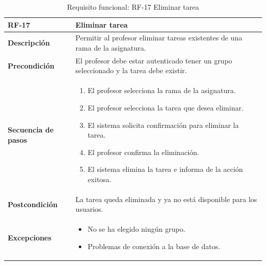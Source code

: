 \begin{table}[H]
\centering
\begin{tabularx}{\textwidth}{
  |>{\centering\arraybackslash}l
  |>{\centering\arraybackslash}X|}
\hline
\textbf{RF-17} & \textbf{Eliminar tarea} \\ \hline

\textbf{Descripción} & Permitir al profesor eliminar tareas existentes de una rama de la asignatura. \\ \hline

\textbf{Precondición} & El profesor debe estar autenticado tener un grupo seleccionado y la tarea debe existir. \\ \hline

\textbf{Secuencia de pasos} & 
\begin{enumerate}
  \item El profesor selecciona la rama de la asignatura.
  \item El profesor selecciona la tarea que desea eliminar.
  \item El sistema solicita confirmación para eliminar la tarea.
  \item El profesor confirma la eliminación.
  \item El sistema elimina la tarea e informa de la acción exitosa.
\end{enumerate} \\ \hline

\textbf{Postcondición} & La tarea queda eliminada y ya no está disponible para los usuarios. \\ \hline

\textbf{Excepciones} & 
\begin{itemize}
  \item No se ha elegido ningún grupo.
  \item Problemas de conexión a la base de datos.
\end{itemize} \\ \hline
\end{tabularx}
\caption{Requisito funcional: RF-17 Eliminar tarea}
\end{table}


